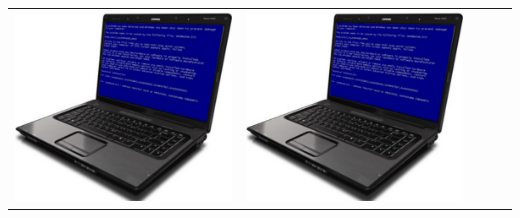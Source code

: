 \begin{frame}
\begin{description}[short]
\begin{tabular}{ccccc}
    \includegraphics[scale=0.025]{input/content/figures/blue_screen.pdf} &
    \includegraphics[scale=0.025]{input/content/figures/blue_screen.pdf} &

\end{tabular}
\end{description}
\end{frame}
